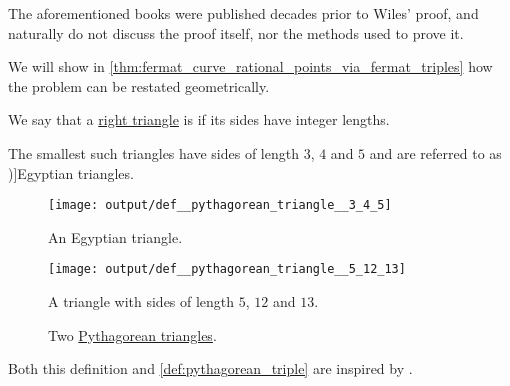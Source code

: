 \begin{remark}
  The aforementioned books were published decades prior to Wiles' proof, and naturally do not discuss the proof itself, nor the methods used to prove it.

  We will show in \cref{thm:fermat_curve_rational_points_via_fermat_triples} how the problem can be restated geometrically.
\end{remark}

\begin{definition}\label{def:pythagorean_triangle}
  We say that a \hyperref[def:triangle/right]{right triangle} is  if its sides have integer lengths.

  The smallest such triangles have sides of length \( 3 \), \( 4 \) and \( 5 \) and are referred to as \term[en=Egyptian triangle (\cite[\S 4.3.1]{Deza2012FigurateNumbers})]{Egyptian triangles}.

  \begin{figure}[!ht]
    \begin{subcaptionblock}[t]{0.40\textwidth}
      \centering
      \texttt{[image: output/def\_\_pythagorean\_triangle\_\_3\_4\_5]}
      \caption{An Egyptian triangle.}\label{fig:def:pythagorean_triangle/3_4_5}
    \end{subcaptionblock}
    \hfill
    \begin{subcaptionblock}[t]{0.55\textwidth}
      \centering
      \texttt{[image: output/def\_\_pythagorean\_triangle\_\_5\_12\_13]}
      \caption{A triangle with sides of length \( 5 \), \( 12 \) and \( 13 \).}\label{fig:def:pythagorean_triangle/5_12_13}
    \end{subcaptionblock}
    \caption{Two \hyperref[def:pythagorean_triangle]{Pythagorean triangles}.}\label{fig:def:pythagorean_triangle/basic}
  \end{figure}
\end{definition}
\begin{comments}
  \item Both this definition and \cref{def:pythagorean_triple} are inspired by .
\end{comments}

